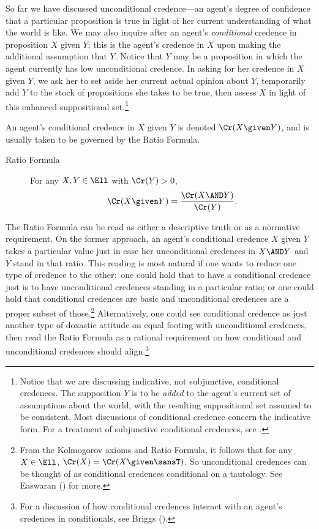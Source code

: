 So far we have discussed unconditional credence---an agent's degree of confidence that a particular proposition is true in light of her current understanding of what the world is like. We may also inquire after an agent's \emph{conditional} credence in proposition $X$ given $Y$; this is the agent's credence in $X$ upon making the additional assumption that $Y$. Notice that $Y$ may be a proposition in which the agent currently has low unconditional credence. In asking for her credence in $X$ given $Y$, we ask her to set aside her current actual opinion about $Y$, temporarily add $Y$ to the stock of propositions she takes to be true, then assess $X$ in light of this enhanced suppositional set.\footnote
{Notice that we are discussing indicative, not subjunctive, conditional credences. The supposition $Y$ is to be \emph{added} to the agent's current set of assumptions about the world, with the resulting suppositional set assumed to be consistent. Most discussions of conditional credence concern the indicative form. For a treatment of subjunctive conditional credences, see \citet{JoyceCausal}.}
 
An agent's conditional credence in $X$ given $Y$ is denoted $\Cr(X \given Y)$, and is usually taken to be governed by the Ratio Formula.
\begin{description}
\item[Ratio Formula] {For any $X, Y \in \Ell$ with $\Cr(Y)>0$,
$$\Cr(X \given Y)=\frac{\Cr(X \AND Y)}{\Cr(Y)}.$$}
\end{description}
The Ratio Formula can be read as either a descriptive truth or as a normative requirement. On the former approach, an agent's conditional credence $X$ given $Y$ takes a particular value just in case her unconditional credences in $X \AND Y$ and $Y$ stand in that ratio. This reading is most natural if one wants to reduce one type of credence to the other:\ one could hold that to have a conditional credence just is to have unconditional credences standing in a particular ratio; or one could hold that conditional credences are basic and unconditional credences are a proper subset of those.\footnote
{\label{n:condbas}From the Kolmogorov axioms and Ratio Formula, it follows that for any $X \in \Ell$, $\Cr(X)=\Cr(X \given \sansT)$. So unconditional credences can be thought of as conditional credences conditional on a tautology. See Easwaran () for more.}
 Alternatively, one could see conditional credence as just another type of doxastic attitude on equal footing with unconditional credences, then read the Ratio Formula as a rational requirement on how conditional and unconditional credences should align.\footnote
{For a discussion of how conditional credences interact with an agent's credences in conditionals, see Briggs ().}

